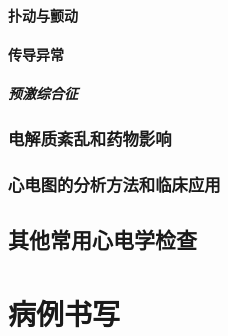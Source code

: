 \documentclass[UTF8]{ctexbook}
\begin{document}
\subsection{扑动与颤动}

\subsection{传导异常}
\subsubsection{预激综合征}

\section{电解质紊乱和药物影响}
\section{心电图的分析方法和临床应用}
\chapter{其他常用心电学检查}

\part{病例书写}

\listoffigures
\listoftables
\end{document}
